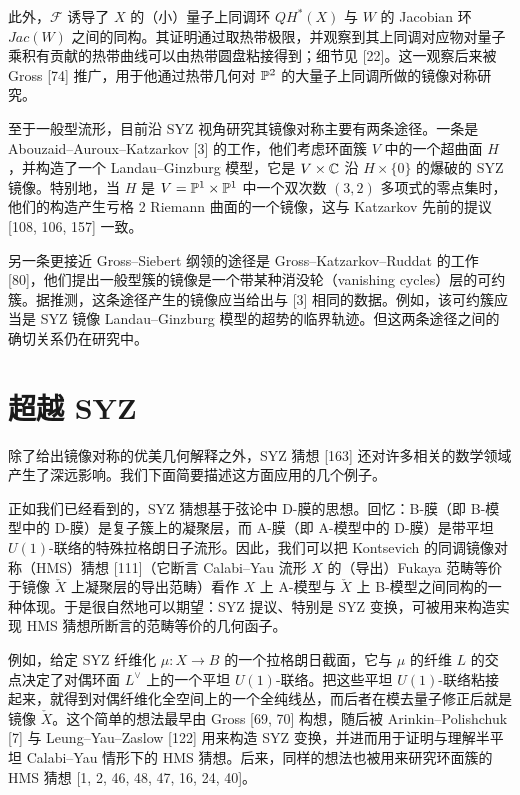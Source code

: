 此外，$\mathcal{F}$ 诱导了 $X$ 的（小）量子上同调环 $QH^*(X)$ 与 $W$ 的 Jacobian 环 $Jac(W)$ 之间的同构。其证明通过取热带极限，并观察到其上同调对应物对量子乘积有贡献的热带曲线可以由热带圆盘粘接得到；细节见 [22]。这一观察后来被 Gross [74] 推广，用于他通过热带几何对 $\mathbb{P}^2$ 的大量子上同调所做的镜像对称研究。

至于一般型流形，目前沿 SYZ 视角研究其镜像对称主要有两条途径。一条是 Abouzaid--Auroux--Katzarkov [3] 的工作，他们考虑环面簇 $V$ 中的一个超曲面 $H$，并构造了一个 Landau--Ginzburg 模型，它是 $V\times\mathbb{C}$ 沿 $H\times\{0\}$ 的爆破的 SYZ 镜像。特别地，当 $H$ 是 $V=\mathbb{P}^1\times\mathbb{P}^1$ 中一个双次数 $(3,2)$ 多项式的零点集时，他们的构造产生亏格 2 Riemann 曲面的一个镜像，这与 Katzarkov 先前的提议 [108, 106, 157] 一致。

另一条更接近 Gross--Siebert 纲领的途径是 Gross--Katzarkov--Ruddat 的工作 [80]，他们提出一般型簇的镜像是一个带某种消没轮（vanishing cycles）层的可约簇。据推测，这条途径产生的镜像应当给出与 [3] 相同的数据。例如，该可约簇应当是 SYZ 镜像 Landau--Ginzburg 模型的超势的临界轨迹。但这两条途径之间的确切关系仍在研究中。

\section{超越 SYZ}
除了给出镜像对称的优美几何解释之外，SYZ 猜想 [163] 还对许多相关的数学领域产生了深远影响。我们下面简要描述这方面应用的几个例子。

正如我们已经看到的，SYZ 猜想基于弦论中 D-膜的思想。回忆：B-膜（即 B-模型中的 D-膜）是复子簇上的凝聚层，而 A-膜（即 A-模型中的 D-膜）是带平坦 $U(1)$-联络的特殊拉格朗日子流形。因此，我们可以把 Kontsevich 的同调镜像对称（HMS）猜想 [111]（它断言 Calabi--Yau 流形 $X$ 的（导出）Fukaya 范畴等价于镜像 $\check X$ 上凝聚层的导出范畴）看作 $X$ 上 A-模型与 $\check X$ 上 B-模型之间同构的一种体现。于是很自然地可以期望：SYZ 提议、特别是 SYZ 变换，可被用来构造实现 HMS 猜想所断言的范畴等价的几何函子。

例如，给定 SYZ 纤维化 $\mu:X\to B$ 的一个拉格朗日截面，它与 $\mu$ 的纤维 $L$ 的交点决定了对偶环面 $L^\vee$ 上的一个平坦 $U(1)$-联络。把这些平坦 $U(1)$-联络粘接起来，就得到对偶纤维化全空间上的一个全纯线丛，而后者在模去量子修正后就是镜像 $\check X$。这个简单的想法最早由 Gross [69, 70] 构想，随后被 Arinkin--Polishchuk [7] 与 Leung--Yau--Zaslow [122] 用来构造 SYZ 变换，并进而用于证明与理解半平坦 Calabi--Yau 情形下的 HMS 猜想。后来，同样的想法也被用来研究环面簇的 HMS 猜想 [1, 2, 46, 48, 47, 16, 24, 40]。


